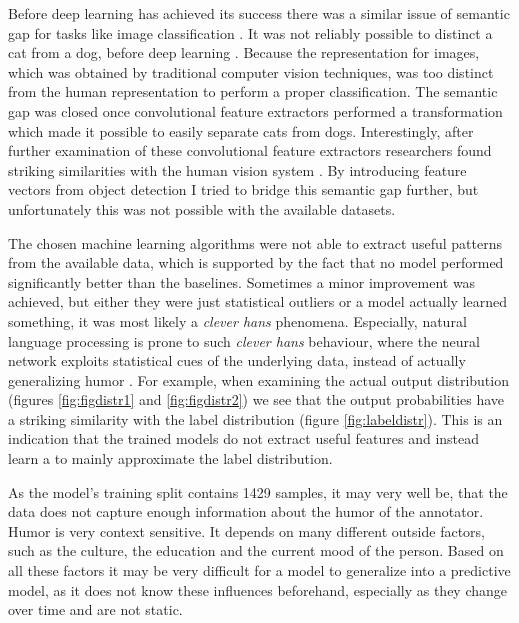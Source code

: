 \documentclass[draft,final,oneside]{vutinfth} %
\begin{document}
Before deep learning has achieved its success there was a similar issue of semantic gap for tasks like image classification \cite{dlvc}. It was not reliably possible to distinct a cat from a dog, before deep learning \cite{alexnet}. Because the representation for images, which was obtained by traditional computer vision techniques, was too distinct from the human representation to perform a proper classification. The semantic gap was closed once convolutional feature extractors performed a transformation which made it possible to easily separate cats from dogs. Interestingly, after further examination of these convolutional feature extractors researchers found striking similarities with the human vision system  \cite{Cichy2016}. By introducing feature vectors from object detection I tried to bridge this semantic gap further, but unfortunately this was not possible with the available datasets.

The chosen machine learning algorithms were not able to extract useful patterns from the available data, which is supported by the fact that no model performed significantly better than the baselines. Sometimes a minor improvement was achieved, but either they were just statistical outliers or a model actually learned something, it was most likely a \textit{clever hans} phenomena. Especially, natural language processing is prone to such \textit{clever hans} behaviour, where the neural network exploits statistical cues of the underlying data, instead of actually generalizing humor \cite{cleverhans}. For example, when examining the actual output distribution (figures \ref{fig:figdistr1} and \ref{fig:figdistr2}) we see that the output probabilities have a striking similarity with the label distribution (figure \ref{fig:labeldistr}). This is an indication that the trained models do not extract useful features and instead learn a to mainly approximate the label distribution.

As the model's training split contains 1429 samples, it may very well be, that the data does not capture enough information about the humor of the annotator. Humor is very context sensitive. It depends on many different outside factors, such as the culture, the education and the current mood of the person. Based on all these factors it may be very difficult for a model to generalize into a predictive model, as it does not know these influences beforehand, especially as they change over time and are not static.
\end{document}
